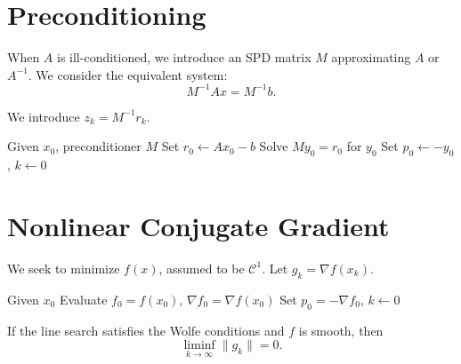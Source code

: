 \section{Preconditioning}

When $A$ is ill-conditioned, we introduce an SPD matrix $M$
approximating $A$ or $A^{-1}$.  
We consider the equivalent system:
\[
M^{-1} A x = M^{-1} b.
\]

We introduce $z_k = M^{-1} r_k$.

\begin{algorithm}[H]
\caption{Preconditioned Conjugate Gradient}
\label{alg:pcg}
Given $x_0$, preconditioner $M$\;
Set $r_0 \leftarrow Ax_0 - b$\;
Solve $My_0 = r_0$ for $y_0$\;
Set $p_0 \leftarrow -y_0$, $k \leftarrow 0$\;
\end{algorithm}
\section{Nonlinear Conjugate Gradient}

We seek to minimize $f(x)$, assumed to be $\mathcal{C}^1$.  
Let $g_k = \nabla f(x_k)$.

\begin{algorithm}[H]
\caption{Fletcher-Reeves Method}
\label{alg:fletcher-reeves}
Given $x_0$\;
Evaluate $f_0 = f(x_0)$, $\nabla f_0 = \nabla f(x_0)$\;
Set $p_0 = -\nabla f_0$, $k \leftarrow 0$\;
\end{algorithm}

\begin{theoreme}
If the line search satisfies the Wolfe conditions and $f$ is smooth, then
\[
\liminf_{k\to\infty} \|g_k\| = 0.
\]
\end{theoreme}

